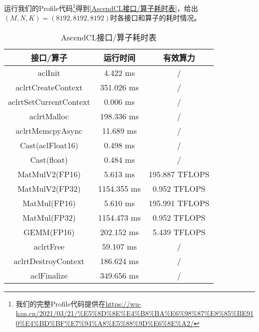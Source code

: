 运行我们的Profile代码\footnote{我们的完整Profile代码提供在\url{https://wu-kan.cn/2021/03/21/\%E5\%8D\%8E\%E4\%B8\%BA\%E6\%98\%87\%E8\%85\%BE910\%E4\%BD\%BF\%E7\%94\%A8\%E5\%88\%9D\%E6\%8E\%A2/}}得到\autoref{AscendCL接口/算子耗时表}，给出$\left(M,N,K\right)=\left(8192,8192,8192\right)$时各接口和算子的耗时情况。

\begin{table}[h] %
    \centering
    \caption{AscendCL接口/算子耗时表}
    \label{AscendCL接口/算子耗时表}
    \begin{tabular}{c|c|c}
        \toprule
        接口/算子              & 运行时间    & 有效算力       \\
        \midrule
        aclInit                & 4.422 ms    & /              \\
        \hline
        aclrtCreateContext     & 351.026 ms  & /              \\
        \hline
        aclrtSetCurrentContext & 0.006 ms    & /              \\
        \hline
        aclrtMalloc            & 198.336 ms  & /              \\
        \hline
        aclrtMemcpyAsync       & 11.689 ms   & /              \\
        \hline
        Cast(aclFloat16)       & 0.498 ms    & /              \\
        \hline
        Cast(float)            & 0.484 ms    & /              \\
        \hline
        MatMulV2(FP16)         & 5.613 ms    & 195.887 TFLOPS \\
        \hline
        MatMulV2(FP32)         & 1154.355 ms & 0.952 TFLOPS   \\
        \hline
        MatMul(FP16)           & 5.610 ms    & 195.991 TFLOPS \\
        \hline
        MatMul(FP32)           & 1154.473 ms & 0.952 TFLOPS   \\
        \hline
        GEMM(FP16)             & 202.152 ms  & 5.439 TFLOPS   \\
        \hline
        aclrtFree              & 59.107 ms   & /              \\
        \hline
        aclrtDestroyContext    & 186.624 ms  & /              \\
        \hline
        aclFinalize            & 349.656 ms  & /              \\
        \hline
        \bottomrule
    \end{tabular}
\end{table}

